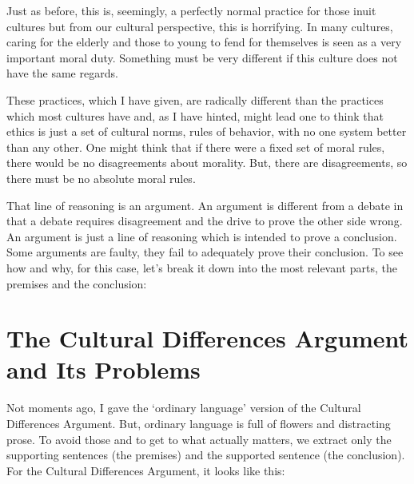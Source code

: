 
Just as before, this is, seemingly, a perfectly normal practice for those inuit cultures but from our cultural perspective, this is horrifying. In many cultures, caring for the elderly and those to young to fend for themselves is seen as a very important moral duty. Something must be very different if this culture does not have the same regards. 

These practices, which I have given, are radically different than the practices which most cultures have and, as I have hinted, might lead one to think that ethics is just a set of cultural norms, rules of behavior, with no one system better than any other. One might think that if there were a fixed set of moral rules, there would be no disagreements about morality. But, there are disagreements, so there must be no absolute moral rules. 

That line of reasoning is an argument. An argument is different from a debate in that a debate requires disagreement and the drive to prove the other side wrong. An argument is just a line of reasoning which is intended to prove a conclusion. Some arguments are faulty, they fail to adequately prove their conclusion. To see how and why, for this case, let's break it down into the most relevant parts, the premises and the conclusion:

\section{The Cultural Differences Argument and Its Problems}

Not moments ago, I gave the `ordinary language' version of the Cultural Differences Argument. But, ordinary language is full of flowers and distracting prose. To avoid those and to get to what actually matters, we extract only the supporting sentences (the premises) and the supported sentence (the conclusion). For the Cultural Differences Argument, it looks like this: 

